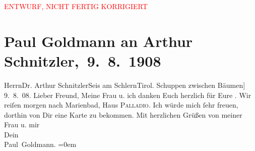 
\begin{center}
            \textcolor{red}{ENTWURF, NICHT FERTIG KORRIGIERT}
                      \end{center}
            
         
         \renewcommand{\erwaehntePersonen}{Personen: Eva Marie Goldmann}
         \renewcommand{\erwaehnteOrte}{Orte: Berlin, Haus Palladio, Marienbad, Seis am Schlern, Südtirol, Villa Heufler}
         \renewcommand{\erwaehnteWerke}{}
               \section[ Paul Goldmann an Arthur Schnitzler, 9. 8. 1908]{ Paul Goldmann an Arthur Schnitzler, 9. 8. 1908}\nopagebreak{}\rehead{ }\begin{ledgroupsized}[t]{13cm}\normalsize\beginnumbering \toendnotes[C]{\smallbreak\pagebreak[2]} 
\toendnotes[C]{\smallbreak}\pstart{}{\pb}Herrn\pend{}\pstart{}Dr. Arthur Schnitzler\pend{}\pstart{}Seis am Schlern\pend{}\pstart{}Tirol.\pend{}{\bigskip}\pstart
           \noindent{}\centering{}{\pb}{[}Schuppen zwischen Bäumen{]}\pend
           \pstart
           {\pb}9. 8. 08.\pend
           \pstart{}Lieber Freund,\pend\pstart
           Meine Frau u. ich danken
               Euch herzlich für Eure \label{K_L03464-1v}\label{K_L03464-1h}.\pend
           \pstart
           Wir reiſen morgen nach Marienbad, Haus
                     \textsc{Palladio}. Ich würde mich ſehr freuen, dorthin von Dir eine Karte zu bekommen.\pend
           \pstart
           Mit herzlichen Grüßen von meiner Frau u. mir {\\[\baselineskip]}Dein {\\[\baselineskip]}\spacefill\mbox{Paul Goldmann.}\pend
           \leftskip=0em{}
         
         \endnumbering{}\end{ledgroupsized}  \newcommand{\dateiname}{L03464}\newcommand{\titel}{Paul Goldmann an Arthur Schnitzler, 9. 8. 1908}\newcommand{\editorInnen}{Martin Anton Müller und Laura Untner}
      